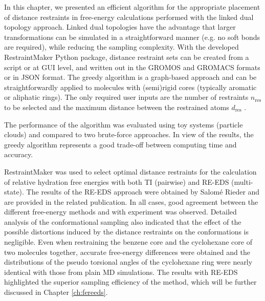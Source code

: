 In this chapter, we presented an efficient algorithm for the appropriate placement of distance restraints in free-energy calculations performed with the linked dual topology approach. Linked dual topologies have the advantage that larger transformations can be simulated in a straightforward manner (e.g. no soft bonds are required), while reducing the sampling complexity. 
With the developed RestraintMaker Python package, distance restraint sets can be created from a script or at GUI level, and written out in the GROMOS and GROMACS formats or in JSON format.
The greedy algorithm is a graph-based approach and can be straightforwardly applied to molecules with (semi)rigid cores (typically aromatic or aliphatic rings). The only required user inputs are the number of restraints $n_\text{res}$ to be selected and the maximum distance between the restrained atoms $d_\text{res}$ .

The performance of the algorithm was evaluated using toy systems (particle clouds) and compared to two brute-force approaches. In view of the results, the greedy algorithm represents a good trade-off between computing time and accuracy.

RestraintMaker was used to select optimal distance restraints for the calculation of relative hydration free energies with both TI (pairwise) and RE-EDS (multi-state). The results of the RE-EDS approach were obtained by Salom{\'e} Rieder and are provided in the related publication. In all cases, good agreement between the different free-energy methods and with experiment was observed. Detailed analysis of the conformational sampling also indicated that the effect of the possible distortions induced by the distance restraints on the conformations is negligible. Even when restraining the benzene core and the cyclohexane core of two molecules together, accurate free-energy differences were obtained and the distributions of the pseudo torsional angles of the cyclohexane ring were nearly identical with those from plain MD simulations.
The results with RE-EDS highlighted the superior sampling efficiency of the method, which will be further discussed in Chapter \ref{ch:fereeds}.
